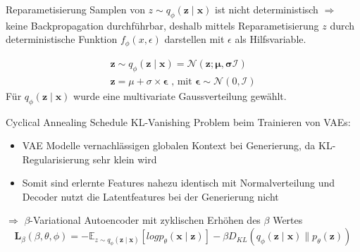 \begin{frame}{Reparametisierung}
  Samplen von $z \sim q_\phi(\mathbf{z\mid x})$ ist nicht deterministisch $\Rightarrow$ keine Backpropagation durchführbar,
  deshalb mittels Reparametisierung $z$ durch deterministische Funktion $f_\phi(x,\epsilon)$ darstellen mit $\epsilon$ als Hilfsvariable.
 
  \begin{align*}
      \mathbf{z} \sim q_\phi(\mathbf{z\mid x}) = \mathcal{N}(\mathbf{z;\mu,\sigma \mathcal{I}}) \nonumber \\
      \mathbf{z} = \mu + \sigma \times \mathbf{\epsilon} \text{ , mit } \mathbf{\epsilon} \sim \mathcal{N}(0,\mathcal{I}) 
  \end{align*}
  Für $q_\phi (\mathbf{z\mid x})$ wurde eine multivariate Gaussverteilung gewählt.

\end{frame}

\begin{frame}{Cyclical Annealing Schedule}
  KL-Vanishing Problem beim Trainieren von VAEs:\begin{itemize}\item VAE Modelle vernachlässigen globalen Kontext bei Generierung, da KL-Regularisierung sehr klein wird \item Somit sind erlernte Features nahezu identisch mit Normalverteilung und Decoder nutzt die Latentfeatures bei der Generierung nicht\end{itemize}
  $\Rightarrow$ $\beta$-Variational Autoencoder mit zyklischen Erhöhen des $\beta$ Wertes
  \begin{equation*}
    \mathbf{L}_{\beta} (\beta,\theta,\phi)= -\mathbb{E}_{z\sim q_\phi(\mathbf{z\mid x})}[log p_\theta (\mathbf{x\mid z})]- \beta D_{KL}(q_\phi(\mathbf{z\mid x}) \parallel p_\theta(\mathbf{z})) 
\end{equation*}
\end{frame}


